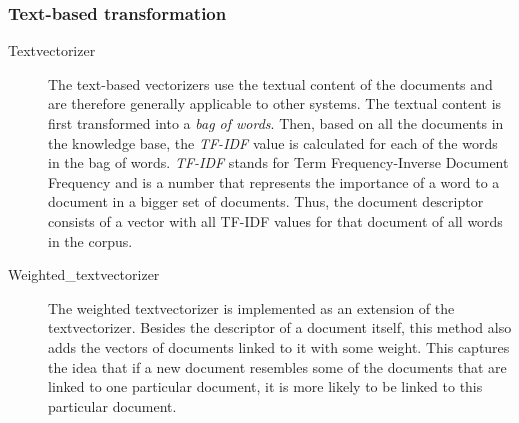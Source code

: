 \subsubsection{Text-based transformation}
\begin{description}
\item [Textvectorizer] The text-based vectorizers use the textual content of the documents and are therefore generally applicable to other systems. The textual content is first transformed into a \emph{bag of words}. Then, based on all the documents in the knowledge base, the \emph{TF-IDF} value is calculated for each of the words in the bag of words. \emph{TF-IDF} stands for Term Frequency-Inverse Document Frequency and is a number that represents the importance of a word to a document in a bigger set of documents. Thus, the document descriptor consists of a vector with all TF-IDF values for that document of all words in the corpus. 

\item[Weighted\_textvectorizer] The weighted textvectorizer is implemented as an extension of the textvectorizer. Besides the descriptor of a document itself, this method also adds the vectors of documents linked to it with some weight. This captures the idea that if a new document resembles some of the documents that are linked to one particular document, it is more likely to be linked to this particular document. 
\end{description}

